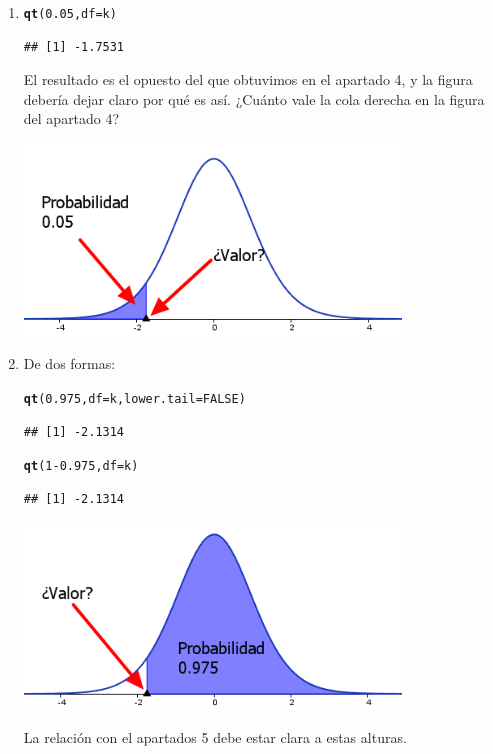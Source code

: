 \documentclass[10pt,a4paper]{article}\usepackage[]{graphicx}\usepackage[]{color}
\makeatletter
\newcommand{\hlnum}[1]{\textcolor[rgb]{0.686,0.059,0.569}{#1}}%
\newcommand{\hlopt}[1]{\textcolor[rgb]{0,0,0}{#1}}%
\newcommand{\hlstd}[1]{\textcolor[rgb]{0.345,0.345,0.345}{#1}}%
\newcommand{\hlkwc}[1]{\textcolor[rgb]{0.333,0.667,0.333}{#1}}%
\newcommand{\hlkwd}[1]{\textcolor[rgb]{0.737,0.353,0.396}{\textbf{#1}}}%
\newenvironment{kframe}{%
 \def\at@end@of@kframe{}%
 \ifinner\ifhmode%
  \def\at@end@of@kframe{\end{minipage}}%
  \begin{minipage}{\columnwidth}%
 \fi\fi%
 \def\FrameCommand##1{\hskip\@totalleftmargin \hskip-\fboxsep
 \colorbox{shadecolor}{##1}\hskip-\fboxsep
     \hskip-\linewidth \hskip-\@totalleftmargin \hskip\columnwidth}%
 \MakeFramed {\advance\hsize-\width
   \@totalleftmargin\z@ \linewidth\hsize
   \@setminipage}}%
 {\par\unskip\endMakeFramed%
 \at@end@of@kframe}
\newenvironment{knitrout}{}{} %
\makeatother
\begin{document}
\begin{enumerate}
  \item
\begin{knitrout}
\color{fgcolor}\begin{kframe}
\begin{alltt}
\hlkwd{qt}\hlstd{(}\hlnum{0.05}\hlstd{,} \hlkwc{df}\hlstd{=k)}
\end{alltt}
\begin{verbatim}
## [1] -1.7531
\end{verbatim}
\end{kframe}
\end{knitrout}
  El resultado es el opuesto del que obtuvimos en el apartado 4, y la figura debería dejar claro por qué es así. ¿Cuánto vale la cola derecha en la figura del apartado 4?
  \begin{center}
        \includegraphics[width=10cm]{../fig/Tut06-25.png}
  \end{center}

  \item
  De dos formas:
\begin{knitrout}
\color{fgcolor}\begin{kframe}
\begin{alltt}
\hlkwd{qt}\hlstd{(}\hlnum{0.975}\hlstd{,} \hlkwc{df}\hlstd{=k,} \hlkwc{lower.tail}\hlstd{=}\hlnum{FALSE}\hlstd{)}
\end{alltt}
\begin{verbatim}
## [1] -2.1314
\end{verbatim}
\begin{alltt}
\hlkwd{qt}\hlstd{(}\hlnum{1}\hlopt{-} \hlnum{0.975}\hlstd{,} \hlkwc{df}\hlstd{=k)}
\end{alltt}
\begin{verbatim}
## [1] -2.1314
\end{verbatim}
\end{kframe}
\end{knitrout}
  \begin{center}
        \includegraphics[width=10cm]{../fig/Tut06-26.png}
  \end{center}
  La relación con el apartados 5 debe estar clara a estas alturas.


\end{enumerate}
\end{document}
